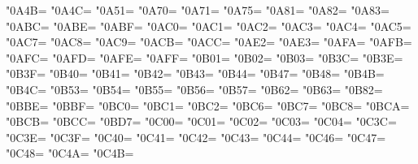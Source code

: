 \XeTeXcharclass"0A4B=\KclassCM
\XeTeXcharclass"0A4C=\KclassCM
\XeTeXcharclass"0A51=\KclassCM
\XeTeXcharclass"0A70=\KclassCM
\XeTeXcharclass"0A71=\KclassCM
\XeTeXcharclass"0A75=\KclassCM
\XeTeXcharclass"0A81=\KclassCM
\XeTeXcharclass"0A82=\KclassCM
\XeTeXcharclass"0A83=\KclassCM
\XeTeXcharclass"0ABC=\KclassCM
\XeTeXcharclass"0ABE=\KclassCM
\XeTeXcharclass"0ABF=\KclassCM
\XeTeXcharclass"0AC0=\KclassCM
\XeTeXcharclass"0AC1=\KclassCM
\XeTeXcharclass"0AC2=\KclassCM
\XeTeXcharclass"0AC3=\KclassCM
\XeTeXcharclass"0AC4=\KclassCM
\XeTeXcharclass"0AC5=\KclassCM
\XeTeXcharclass"0AC7=\KclassCM
\XeTeXcharclass"0AC8=\KclassCM
\XeTeXcharclass"0AC9=\KclassCM
\XeTeXcharclass"0ACB=\KclassCM
\XeTeXcharclass"0ACC=\KclassCM
\XeTeXcharclass"0AE2=\KclassCM
\XeTeXcharclass"0AE3=\KclassCM
\XeTeXcharclass"0AFA=\KclassCM
\XeTeXcharclass"0AFB=\KclassCM
\XeTeXcharclass"0AFC=\KclassCM
\XeTeXcharclass"0AFD=\KclassCM
\XeTeXcharclass"0AFE=\KclassCM
\XeTeXcharclass"0AFF=\KclassCM
\XeTeXcharclass"0B01=\KclassCM
\XeTeXcharclass"0B02=\KclassCM
\XeTeXcharclass"0B03=\KclassCM
\XeTeXcharclass"0B3C=\KclassCM
\XeTeXcharclass"0B3E=\KclassCM
\XeTeXcharclass"0B3F=\KclassCM
\XeTeXcharclass"0B40=\KclassCM
\XeTeXcharclass"0B41=\KclassCM
\XeTeXcharclass"0B42=\KclassCM
\XeTeXcharclass"0B43=\KclassCM
\XeTeXcharclass"0B44=\KclassCM
\XeTeXcharclass"0B47=\KclassCM
\XeTeXcharclass"0B48=\KclassCM
\XeTeXcharclass"0B4B=\KclassCM
\XeTeXcharclass"0B4C=\KclassCM
\XeTeXcharclass"0B53=\KclassCM
\XeTeXcharclass"0B54=\KclassCM
\XeTeXcharclass"0B55=\KclassCM
\XeTeXcharclass"0B56=\KclassCM
\XeTeXcharclass"0B57=\KclassCM
\XeTeXcharclass"0B62=\KclassCM
\XeTeXcharclass"0B63=\KclassCM
\XeTeXcharclass"0B82=\KclassCM
\XeTeXcharclass"0BBE=\KclassCM
\XeTeXcharclass"0BBF=\KclassCM
\XeTeXcharclass"0BC0=\KclassCM
\XeTeXcharclass"0BC1=\KclassCM
\XeTeXcharclass"0BC2=\KclassCM
\XeTeXcharclass"0BC6=\KclassCM
\XeTeXcharclass"0BC7=\KclassCM
\XeTeXcharclass"0BC8=\KclassCM
\XeTeXcharclass"0BCA=\KclassCM
\XeTeXcharclass"0BCB=\KclassCM
\XeTeXcharclass"0BCC=\KclassCM
\XeTeXcharclass"0BD7=\KclassCM
\XeTeXcharclass"0C00=\KclassCM
\XeTeXcharclass"0C01=\KclassCM
\XeTeXcharclass"0C02=\KclassCM
\XeTeXcharclass"0C03=\KclassCM
\XeTeXcharclass"0C04=\KclassCM
\XeTeXcharclass"0C3C=\KclassCM
\XeTeXcharclass"0C3E=\KclassCM
\XeTeXcharclass"0C3F=\KclassCM
\XeTeXcharclass"0C40=\KclassCM
\XeTeXcharclass"0C41=\KclassCM
\XeTeXcharclass"0C42=\KclassCM
\XeTeXcharclass"0C43=\KclassCM
\XeTeXcharclass"0C44=\KclassCM
\XeTeXcharclass"0C46=\KclassCM
\XeTeXcharclass"0C47=\KclassCM
\XeTeXcharclass"0C48=\KclassCM
\XeTeXcharclass"0C4A=\KclassCM
\XeTeXcharclass"0C4B=\KclassCM
